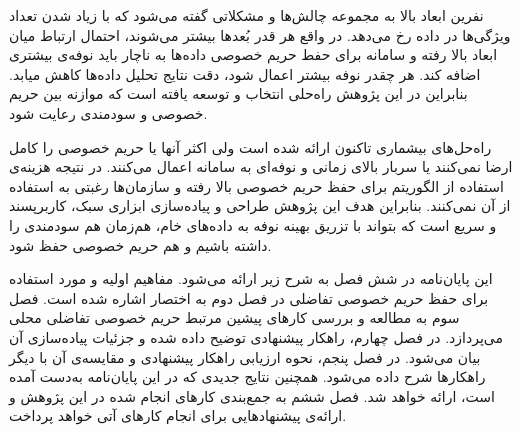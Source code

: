 نفرین ابعاد بالا به مجموعه چالش‌ها و مشکلاتی گفته می‌شود که با زیاد شدن تعداد ویژگی‌ها در داده رخ می‌دهد. در واقع هر قدر بُعد‌ها بیشتر می‌شوند، احتمال ارتباط میان ابعاد بالا رفته و سامانه برای حفط حریم خصوصی داده‌‌ها به ناچار باید نوفه‌ی بیشتری اضافه کند. هر چقدر نوفه بیشتر اعمال شود، دقت نتایج تحلیل داده‌ها کاهش میابد. بنابراین در این پژوهش راه‌حلی انتخاب و توسعه یافته است که موازنه بین حریم خصوصی و سودمندی رعایت شود.



راه‌حل‌های بیشماری تاکنون ارائه شده‌ است ولی اکثر آنها یا حریم خصوصی را کامل ارضا نمی‌کنند یا سربار بالای زمانی و نوفه‌ای به سامانه اعمال می‌کنند. در نتیجه هزینه‌ی استفاده از الگوریتم برای حفظ حریم خصوصی بالا رفته و سازمان‌ها رغبتی به استفاده از آن نمی‌کنند. بنابراین هدف این پژوهش طراحی و پیاده‌سازی ابزاری سبک، کاربرپسند و سریع است که بتواند با تزریق بهینه نوفه به داده‌های خام، هم‌زمان هم سودمندی را داشته باشیم و هم حریم خصوصی حفظ شود.


این پایان‌نامه در شش فصل به شرح زیر ارائه می‌شود.
مفاهیم اولیه و مورد استفاده برای حفظ حریم خصوصی تفاضلی در فصل دوم به اختصار اشاره شده است. 
فصل سوم به مطالعه و بررسی کارهای پیشین مرتبط حریم خصوصی تفاضلی محلی می‌پردازد.
در فصل چهارم، راهکار پیشنهادی توضیح داده شده و جزئیات پیاده‌سازی آن بیان می‌شود.
در فصل پنجم، نحوه ارزیابی راهکار پیشنهادی و مقایسه‌ی آن با دیگر راهکارها شرح داده می‌شود. همچنین نتایج جدیدی که در این پایان‌نامه به‌دست آمده است، ارائه خواهد شد.
فصل ششم به جمع‌بندی کارهای انجام شده در این پژوهش و ارائه‌ی پیشنهادهایی برای انجام کارهای آتی خواهد پرداخت.